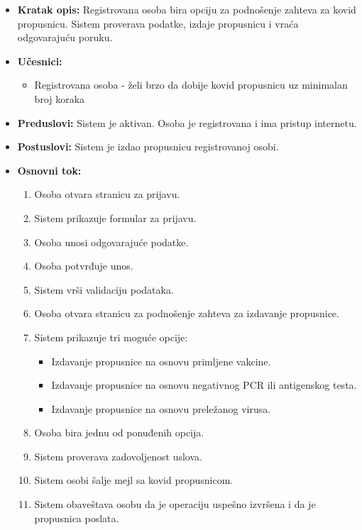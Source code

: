 \documentclass[titlepage]{article}
\begin{document}
\begin{itemize}
    \item \textbf{Kratak opis:} Registrovana osoba bira opciju za podnošenje zahteva za kovid propusnicu. Sistem proverava podatke, izdaje propusnicu i vraća odgovarajuću poruku.
    \item \textbf{Učesnici:}
        \begin{itemize}
            \item Registrovana osoba - želi brzo da dobije kovid propusnicu uz minimalan broj koraka
        \end{itemize}
    \item \textbf{Preduslovi:} Sistem je aktivan. Osoba je registrovana i ima pristup internetu.
    \item \textbf{Postuslovi:} Sistem je izdao propusnicu registrovanoj osobi.
    \item \textbf{Osnovni tok:}
        \begin{enumerate}
            \item Osoba otvara stranicu za prijavu.
            \item Sistem prikazuje formular za prijavu.
            \item Osoba unosi odgovarajuće podatke.
            \item Osoba potvrđuje unos.
            \item Sistem vrši validaciju podataka.
            \item Osoba otvara stranicu za podnošenje zahteva za izdavanje propusnice.
            \item Sistem prikazuje tri moguće opcije:
                \begin{itemize}
                    \item Izdavanje propusnice na osnovu primljene vakcine.
                    \item Izdavanje propusnice na osnovu negativnog PCR ili antigenskog testa.
                    \item Izdavanje propusnice na osnovu preležanog virusa.
                \end{itemize}
            \item Osoba bira jednu od ponuđenih opcija.
            \item Sistem proverava zadovoljenost uslova.
            \item Sistem osobi šalje mejl sa kovid propusnicom.
            \item Sistem obaveštava osobu da je operaciju uspešno izvršena i da je propusnica poslata.
        \end{enumerate}
     

\end{itemize}
\end{document}
